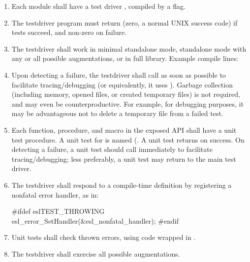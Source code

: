 \begin{enumerate}

\item Each module shall have a test driver , compiled by 
      a  flag.

\item The testdriver program must return  (zero, a normal
      UNIX success code) if tests succeed, and non-zero on failure.

\item The testdriver shall work in minimal standalone mode, 
      standalone mode with any or all possible augmentations, 
      or in full library. Example compile lines:
\begin{cchunk}
\end{cchunk}

\item Upon detecting a failure, the testdriver shall call
       as soon as possible to facilitate
      tracing/debugging (or equivalently, it uses
      ). Garbage collection (including memory, opened
      files, or created temporary files) is not required, and may even
      be counterproductive. For example, for debugging purposes, it
      may be advantageous not to delete a temporary file from a failed
      test.

\item Each function, procedure, and macro in the exposed API shall
      have a unit test procedure. A unit test for
       is named (. A unit test returns  on success.  On
      detecting a failure, a unit test should call 
      immediately to facilitate tracing/debugging; less preferably, a
      unit test may return  to the main test driver.

\item The testdriver shall respond to a 
      compile-time definition by registering a nonfatal error handler,
      as in:
\begin{cchunk}
      #ifdef eslTEST_THROWING
        esl_error_SetHandler(&esl_nonfatal_handler);
      #endif
\end{cchunk}

\item Unit tests shall check thrown errors, using code
      wrapped in .

\item The testdriver shall exercise all possible augmentations.
\end{enumerate}











